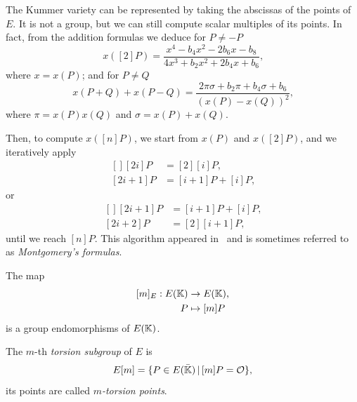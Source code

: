 \begin{remark}
  \label{rk:montgomery}
  The Kummer variety can be represented by taking the abscissas of the
  points of $E$. It is not a group, but we can still compute scalar
  multiples of its points. In fact, from the addition formulas we
  deduce for $P\ne-P$
  \begin{equation}
    \label{eq:128}
    x([2]P) = \frac{x^4-b_4x^2-2b_6x-b_8}{4x^3+b_2x^2+2b_4x+b_6}
    \text{,}
  \end{equation}
  where $x=x(P)$; and for $P\ne Q$
  \begin{equation}
    \label{eq:129}
    x(P+Q) + x(P-Q) =
    \frac{2\pi\sigma + b_2\pi + b_4\sigma + b_6}{(x(P)-x(Q))^2}
    \text{,}
  \end{equation}
  where $\pi=x(P)x(Q)$ and $\sigma=x(P)+x(Q)$. 

  Then, to compute $x([n]P)$, we start from $x(P)$ and $x([2]P)$, and
  we iteratively apply
  \begin{equation}
    \label{eq:130}
    \begin{aligned}[]
      [2i]P   &= [2][i]P\text{,}\\
      [2i+1]P &= [i+1]P + [i]P\text{,}
    \end{aligned}
  \end{equation}  
  or
  \begin{equation}
    \label{eq:131}
    \begin{aligned}[]
      [2i+1]P &= [i+1]P + [i]P\text{,}\\
      [2i+2]P &= [2][i+1]P\text{,}
    \end{aligned}
  \end{equation}
  until we reach $[n]P$. This algorithm appeared
  in~\cite{montgomery87} and is sometimes referred to as
  \emph{Montgomery's formulas}.
\end{remark}

The map
\begin{equation}
  \label{eq:122}
  \begin{aligned}[]
    [m]_E : E(\K) &\ra E(\K)\text{,}\\
    P &\mapsto [m]P
  \end{aligned}
\end{equation}
is a group endomorphisms of $E(\mathbb{K})$. 

\begin{definition}
  The $m$-th \emph{torsion subgroup} of $E$ is
  \begin{equation}
    \label{eq:123}
    E[m] = \{P\in E(\bar{\mathbb{K}}) \,|\, [m]P=\mathcal{O}\}
    \text{,}
  \end{equation}
  its points are called
  \emph{$m$-torsion
    points}.
\end{definition}

